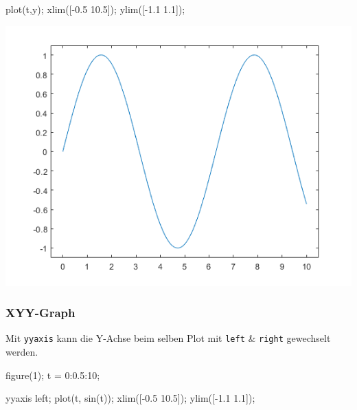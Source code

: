 \documentclass[
  10pt,
  a4paper,
  german]{article}
\newenvironment{Shaded}{}{}
\newcommand{\FloatTok}[1]{\textcolor[rgb]{0.00,0.36,0.77}{#1}}
\newcommand{\NormalTok}[1]{\textcolor[rgb]{0.14,0.16,0.18}{#1}}
\newcommand{\OperatorTok}[1]{\textcolor[rgb]{0.14,0.16,0.18}{#1}}
\newcommand{\VariableTok}[1]{\textcolor[rgb]{0.89,0.38,0.04}{#1}}
\numberwithin{equation}{section}
\begin{document}
\begin{multicols}{2}
\begin{Shaded}
\begin{Highlighting}[]
\VariableTok{plot}\NormalTok{(}\VariableTok{t}\OperatorTok{,}\VariableTok{y}\NormalTok{)}\OperatorTok{;}
\VariableTok{xlim}\NormalTok{([}\OperatorTok{{-}}\FloatTok{0.5} \FloatTok{10.5}\NormalTok{])}\OperatorTok{;}
\VariableTok{ylim}\NormalTok{([}\OperatorTok{{-}}\FloatTok{1.1} \FloatTok{1.1}\NormalTok{])}\OperatorTok{;}
\end{Highlighting}
\end{Shaded}

\includegraphics{images/plot_simple.png}

\hypertarget{xyy-graph}{%
\subsubsection{XYY-Graph}\label{xyy-graph}}

Mit \texttt{yyaxis} kann die Y-Achse beim selben Plot mit \texttt{left}
\& \texttt{right} gewechselt werden.

\begin{Shaded}
\begin{Highlighting}[]
\VariableTok{figure}\NormalTok{(}\FloatTok{1}\NormalTok{)}\OperatorTok{;}
\VariableTok{t} \OperatorTok{=} \FloatTok{0}\OperatorTok{:}\FloatTok{0.5}\OperatorTok{:}\FloatTok{10}\OperatorTok{;}

\VariableTok{yyaxis} \VariableTok{left}\OperatorTok{;}
\VariableTok{plot}\NormalTok{(}\VariableTok{t}\OperatorTok{,} \VariableTok{sin}\NormalTok{(}\VariableTok{t}\NormalTok{))}\OperatorTok{;}
\VariableTok{xlim}\NormalTok{([}\OperatorTok{{-}}\FloatTok{0.5} \FloatTok{10.5}\NormalTok{])}\OperatorTok{;}
\VariableTok{ylim}\NormalTok{([}\OperatorTok{{-}}\FloatTok{1.1} \FloatTok{1.1}\NormalTok{])}\OperatorTok{;}


\end{Highlighting}
\end{Shaded}
\end{multicols}
\end{document}
